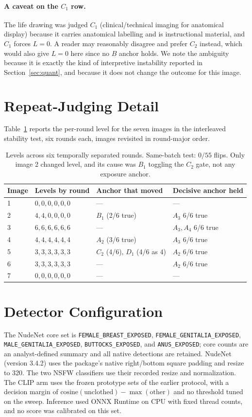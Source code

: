 \documentclass[11pt]{article}
\begin{document}
\paragraph{A caveat on the $C_1$ row.} The life drawing was judged $C_1$ (clinical/technical imaging for anatomical display) because it carries anatomical labelling and is instructional material, and $C_1$ forces $L=0$. A reader may reasonably disagree and prefer $C_2$ instead, which would also give $L=0$ here since no $B$ anchor holds. We note the ambiguity because it is exactly the kind of interpretive instability reported in Section~\ref{sec:quant}, and because it does not change the outcome for this image.

\section{Repeat-Judging Detail}
\label{app:stability}
Table~\ref{tab:stability} reports the per-round level for the seven images in the interleaved stability test, six rounds each, images revisited in round-major order.

\begin{table}[h]
\centering\small
\begin{tabularx}{\columnwidth}{@{}lXXX@{}}
\toprule
Image & Levels by round & Anchor that moved & Decisive anchor held \\
\midrule
1 & $0,0,0,0,0,0$ & --- & --- \\
2 & $4,4,0,0,0,0$ & $B_1$ (2/6 true) & $A_3$ 6/6 true \\
3 & $6,6,6,6,6,6$ & --- & $A_3,A_4$ 6/6 true \\
4 & $4,4,4,4,4,4$ & $A_2$ (3/6 true) & $A_3$ 6/6 true \\
5 & $3,3,3,3,3,3$ & $C_2$ (4/6), $D_1$ (4/6 as $4$) & $A_2$ 6/6 true \\
6 & $3,3,3,3,3,3$ & --- & $A_2$ 6/6 true \\
7 & $0,0,0,0,0,0$ & --- & --- \\
\bottomrule
\end{tabularx}
\caption{Levels across six temporally separated rounds. Same-batch test: $0/55$ flips. Only image 2 changed level, and its cause was $B_1$ toggling the $C_2$ gate, not any exposure anchor.}
\label{tab:stability}
\end{table}

\section{Detector Configuration}
\label{app:detectors}
The NudeNet core set is \texttt{FEMALE\_BREAST\_EXPOSED}, \texttt{FEMALE\_GENITALIA\_EXPOSED}, \texttt{MALE\_GENITALIA\_EXPOSED}, \texttt{BUTTOCKS\_EXPOSED}, and \texttt{ANUS\_EXPOSED}; core counts are an analyst-defined summary and all native detections are retained. NudeNet (version 3.4.2) uses the package's native right/bottom square padding and resize to 320. The two NSFW classifiers use their recorded resize and normalization. The CLIP arm uses the frozen prototype sets of the earlier protocol, with a decision margin of $\text{cosine}(\text{unclothed})-\max(\text{other})$ and no threshold tuned on the sweep. Inference used ONNX Runtime on CPU with fixed thread counts, and no score was calibrated on this set.
\end{document}
